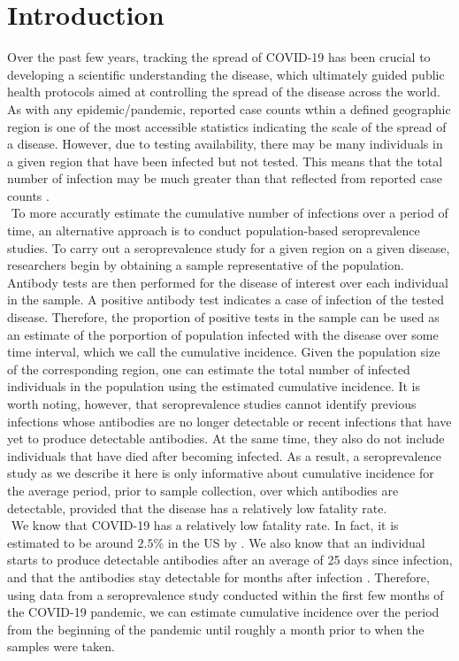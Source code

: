 \section{Introduction}
Over the past few years, tracking the spread of COVID-19 has been crucial to developing a scientific understanding the disease, which ultimately guided public health protocols aimed at controlling the spread of the disease across the world. As with any epidemic/pandemic, reported case counts wthin a defined geographic region is one of the most accessible statistics indicating the scale of the spread of a disease. However, due to testing availability, there may be many individuals in a given region that have been infected but not tested. This means that the total number of infection may be much greater than that reflected from reported case counts \citep{byambasuren2021comparison}.\\
\newline$ $
To more accuratly estimate the cumulative number of infections over a period of time, an alternative approach is to conduct population-based seroprevalence studies. To carry out a seroprevalence study for a given region on a given disease, researchers begin by obtaining a sample representative of the population. Antibody tests are then performed for the disease of interest over each individual in the sample. A positive antibody test indicates a case of infection of the tested disease. Therefore, the proportion of positive tests in the sample can be used as an estimate of the porportion of population infected with the disease over some time interval, which we call the cumulative incidence. Given the population size of the corresponding region, one can estimate the total number of infected individuals in the population using the estimated cumulative incidence. It is worth noting, however, that seroprevalence studies cannot identify previous infections whose antibodies are no longer detectable or recent infections that have yet to produce detectable antibodies. At the same time, they also do not include individuals that have died after becoming infected. As a result, a seroprevalence study as we describe it here is only informative about cumulative incidence for the average period, prior to sample collection, over which antibodies are detectable, provided that the disease has a relatively low fatality rate.\\
\newline$ $
We know that COVID-19 has a relatively low fatality rate. In fact, it is estimated to be around $2.5$\% in the US by \cite{khafaie2020cross}. We also know that an individual starts to produce detectable antibodies after an average of 25 days since infection, and that the antibodies stay detectable for months after infection \citep{sethuraman2020interpreting,choe2021antibody}. Therefore, using data from a seroprevalence study conducted within the first few months of the COVID-19 pandemic, we can estimate cumulative incidence over the period from the beginning of the pandemic until roughly a month prior to when the samples were taken.
